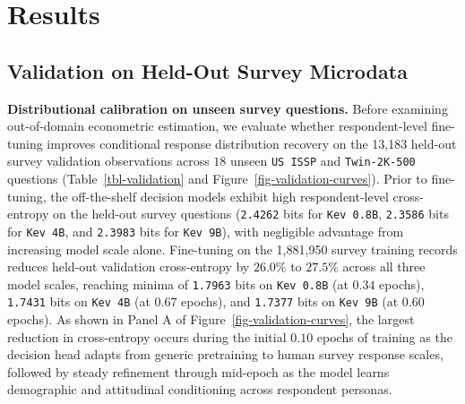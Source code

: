 \documentclass[
  letterpaper,
  DIV=11,
  numbers=noendperiod]{scrartcl}
\begin{document}
\section{Results}\label{sec-results}

\subsection{Validation on Held-Out Survey
Microdata}\label{validation-on-held-out-survey-microdata}

\textbf{Distributional calibration on unseen survey questions.} Before
examining out-of-domain econometric estimation, we evaluate whether
respondent-level fine-tuning improves conditional response distribution
recovery on the 13,183 held-out survey validation observations across
\(18\) unseen \texttt{US\ ISSP} and \texttt{Twin-2K-500} questions
(Table~\ref{tbl-validation} and Figure~\ref{fig-validation-curves}).
Prior to fine-tuning, the off-the-shelf decision models exhibit high
respondent-level cross-entropy on the held-out survey questions
(\texttt{2.4262} bits for \texttt{Kev\ 0.8B}, \texttt{2.3586} bits for
\texttt{Kev\ 4B}, and \texttt{2.3983} bits for \texttt{Kev\ 9B}), with
negligible advantage from increasing model scale alone. Fine-tuning on
the 1,881,950 survey training records reduces held-out validation
cross-entropy by \(26.0\%\) to \(27.5\%\) across all three model scales,
reaching minima of \texttt{1.7963} bits on \texttt{Kev\ 0.8B} (at
\(0.34\) epochs), \texttt{1.7431} bits on \texttt{Kev\ 4B} (at \(0.67\)
epochs), and \texttt{1.7377} bits on \texttt{Kev\ 9B} (at \(0.60\)
epochs). As shown in Panel A of Figure~\ref{fig-validation-curves}, the
largest reduction in cross-entropy occurs during the initial \(0.10\)
epochs of training as the decision head adapts from generic pretraining
to human survey response scales, followed by steady refinement through
mid-epoch as the model learns demographic and attitudinal conditioning
across respondent personas.
\end{document}
